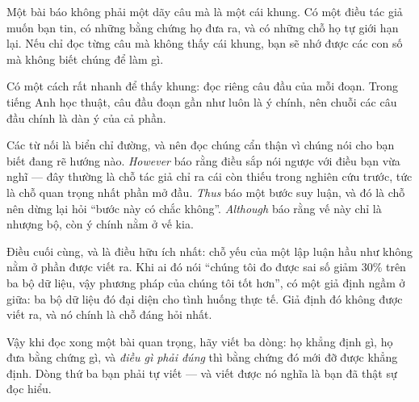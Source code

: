 \documentclass[../../english.tex]{subfiles}
\begin{document}
\begin{dongian}
Một bài báo không phải một dãy câu mà là một cái khung. Có một điều tác giả muốn bạn tin, có những bằng chứng họ đưa ra, và có những chỗ họ tự giới hạn lại. Nếu chỉ đọc từng câu mà không thấy cái khung, bạn sẽ nhớ được các con số mà không biết chúng để làm gì.

Có một cách rất nhanh để thấy khung: đọc riêng câu đầu của mỗi đoạn. Trong tiếng Anh học thuật, câu đầu đoạn gần như luôn là ý chính, nên chuỗi các câu đầu chính là dàn ý của cả phần.

Các từ nối là biển chỉ đường, và nên đọc chúng cẩn thận vì chúng nói cho bạn biết đang rẽ hướng nào. \emph{However} báo rằng điều sắp nói ngược với điều bạn vừa nghĩ --- đây thường là chỗ tác giả chỉ ra cái còn thiếu trong nghiên cứu trước, tức là chỗ quan trọng nhất phần mở đầu. \emph{Thus} báo một bước suy luận, và đó là chỗ nên dừng lại hỏi ``bước này có chắc không''. \emph{Although} báo rằng vế này chỉ là nhượng bộ, còn ý chính nằm ở vế kia.

Điều cuối cùng, và là điều hữu ích nhất: chỗ yếu của một lập luận hầu như không nằm ở phần được viết ra. Khi ai đó nói ``chúng tôi đo được sai số giảm 30\% trên ba bộ dữ liệu, vậy phương pháp của chúng tôi tốt hơn'', có một giả định ngầm ở giữa: ba bộ dữ liệu đó đại diện cho tình huống thực tế. Giả định đó không được viết ra, và nó chính là chỗ đáng hỏi nhất.

Vậy khi đọc xong một bài quan trọng, hãy viết ba dòng: họ khẳng định gì, họ đưa bằng chứng gì, và \emph{điều gì phải đúng} thì bằng chứng đó mới đỡ được khẳng định. Dòng thứ ba bạn phải tự viết --- và viết được nó nghĩa là bạn đã thật sự đọc hiểu.
\end{dongian}
\end{document}
